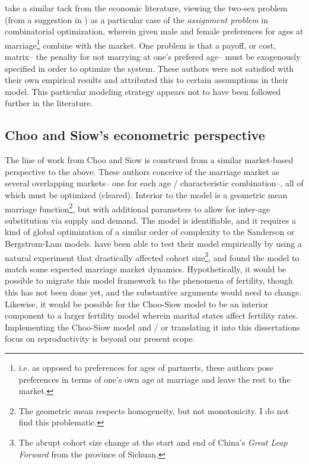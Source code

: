 \citet{bergstrom1994sweden} take a similar tack from the economic literature,
viewing the two-sex problem (from a suggestion in \citet{becker1973theory}) as a
particular case of the \textit{assignment problem} in combinatorial optimization, wherein given male
and female preferences for ages at marriage\footnote{i.e. as opposed to
preferences for ages of partnerts, these authors pose preferences in terms of
one's own age at marriage and leave the rest to the market.} combine with the
market. One problem is that a payoff, or cost, matrix-- the penalty for not
marrying at one's prefered age-- must be exogenously specified in order to
optimize the system. These authors were not satisfied with their own
empirical results and attributed this to certain assumptions in their model.
This particular modeling strategy appears not to have been followed further in
the literature.

\subsection{Choo and Siow's econometric perspective} 
The line of work from Choo
and Siow \citet{choo2006estimating, siow2008does, seitz2010collective} is construed 
from a similar market-based perspective to the above. These
authors conceive of the marriage market as several overlapping markets-- one
for each age / characteristic combination--, all of which must be optimized
(cleared). Interior to the model is a geometric mean marriage
function\footnote{The geometric mean respects homogeneity, but not
monotonicity. I do not find this problematic.}, but with additional
parameters to allow for inter-age substitution via supply and demand. The model
is identifiable, and it requires a kind of global optimization of a similar
order of complexity to the Sanderson or Bergstrom-Lam models. \citet{siow2008does} have
been able to test their model empirically by using a natural experiment that
drastically affected cohort size\footnote{The abrupt cohort size change at the
start and end of China's \textit{Great Leap Forward} from the province of
Sichuan.}, and found the model to match some expected marriage market
dynamics. Hypothetically, it would be possible to migrate this model framework
to the phenomena of fertility, though this has not been done yet, and the
substantive arguments would need to change. Likewise, it would be possible for
the Choo-Siow model to be an interior component to a larger fertility model
wherein marital states affect fertility rates. Implementing the Choo-Siow model
and / or translating it into this dissertations focus on reproductivity is
beyond our present scope. 

